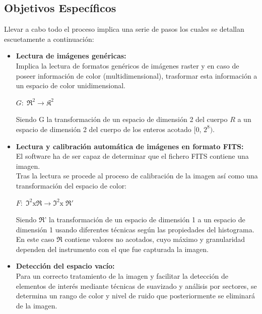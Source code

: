 	\subsection{Objetivos Específicos}
	Llevar a cabo todo el proceso implica una serie de pasos los cuales se detallan escuetamente a continuación:
	\begin{itemize}
		\item \textbf{Lectura de imágenes genéricas:}\\
		Implica la lectura de formatos genéricos de imágenes raster y en caso de poseer información de color (multidimensional), trasformar esta información a un espacio de color unidimensional.
		\begin{center}
		{\large $G:\mathfrak{\;R^{2}\rightarrow\mathfrak{K^{2}}}$}
		\end{center}
		Siendo G la transformación de un espacio de dimensión 2 del cuerpo $R$ a un espacio de dimensión 2 del cuerpo de los enteros acotado {[}0, $2^{8})$.
		
		\item \textbf{Lectura y calibración automática de imágenes en formato FITS:}\\
		El software ha de ser capaz de determinar que el fichero FITS contiene
		una imagen. \\
		Tras la lectura se procede al proceso de calibración de la imagen
		así como una transformación del espacio de color:\\
		\begin{center}
		{\large 	$F:\mathfrak{\;I^{2}\mathrm{x\mathfrak{R}}\rightarrow\mathfrak{I^{2}\mathrm{x\;\mathfrak{R'}}}}$\\}
		\end{center}
		Siendo $\mathfrak{R}$' la transformación de un espacio de dimensión
		1 a un espacio de dimensión 1 usando diferentes técnicas según las
		propiedades del histograma. En este caso $\mathfrak{R}$ contiene
		valores no acotados, cuyo máximo y granularidad dependen del instrumento
		con el que fue capturada la imagen.
		
		\item \textbf{Detección del espacio vacío:}\\
		Para un correcto tratamiento de la imagen y facilitar la detección de elementos de interés mediante técnicas de suavizado y análisis por sectores, se determina un rango de color y nivel de ruido que posteriormente se eliminará de la imagen.
		

\end{itemize}

